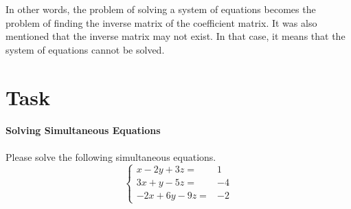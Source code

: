 \documentclass{ltjsbook}
\begin{document}
In other words, the problem of solving a system of equations becomes the problem of finding the inverse matrix of the coefficient matrix. It was also mentioned that the inverse matrix may not exist. In that case, it means that the system of equations cannot be solved.


\section{Task}



\paragraph{Solving Simultaneous Equations}Please solve the following simultaneous equations.
\[
	\left\{\begin{array}{rr}x-2 y+3 z= & 1 \\ 3 x+y-5 z= & -4 \\ -2 x+6 y-9 z= & -2\end{array}\right.
\]
\end{document}
